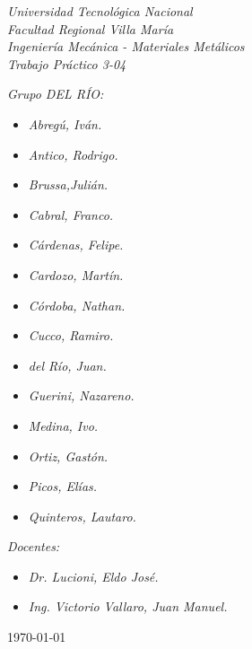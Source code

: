 \begin{titlepage}
	
	\begin{center}
		{\huge \textit{Universidad Tecnológica Nacional}}\\
        \vspace{0.5cm}
		{\LARGE \textit{Facultad Regional Villa María}}\\
		\vspace{1.5cm}
        {\LARGE{\textit{Ingeniería Mecánica - Materiales Metálicos}}}\\
		\vspace{1.5cm}
        \LARGE{\textit{Trabajo Práctico 3-04}}
	\end{center}
	
	\vfill

    \textit{Grupo DEL RÍO:}
	\begin{itemize}
		\item \textit{Abregú, Iván.}
		\item \textit{Antico, Rodrigo.}
		\item \textit{Brussa,Julián.}
		\item \textit{Cabral, Franco.}
        \item \textit{Cárdenas, Felipe.}
        \item \textit{Cardozo, Martín.}
        \item \textit{Córdoba, Nathan.}
        \item \textit{Cucco, Ramiro.}
        \item \textit{del Río, Juan.}
        \item \textit{Guerini, Nazareno.}
        \item \textit{Medina, Ivo.}
        \item \textit{Ortiz, Gastón.}
        \item \textit{Picos, Elías.}
        \item \textit{Quinteros, Lautaro.}
	\end{itemize}
    
	\textit{Docentes:}
	\begin{itemize}
		\item \textit{Dr. Lucioni, Eldo José.}
		\item \textit{Ing. Victorio Vallaro, Juan Manuel.}
	\end{itemize}
	\centering
	\today
	
\end{titlepage}
